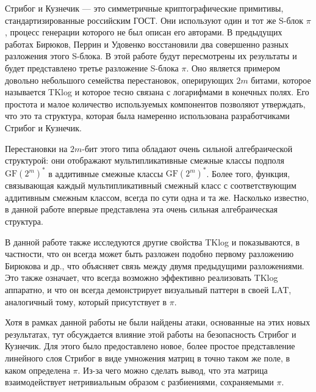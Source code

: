 \abstract

Стрибог и Кузнечик — это симметричные криптографические примитивы, стандартизированные российским ГОСТ. Они используют один и тот же S-блок \(\pi\), процесс генерации которого не был описан его авторами. В предыдущих работах Бирюков, Перрин и Удовенко восстановили два совершенно разных разложения этого S-блока. В этой работе будут пересмотрены их результаты и будет представлено третье разложение S-блока \(\pi\). Оно является примером довольно небольшого семейства перестановок, оперирующих \(2m\) битами, которое называется TKlog и которое тесно связана с логарифмами в конечных полях. Его простота и малое количество используемых компонентов позволяют утверждать, что это та структура, которая была намеренно использована разработчиками Стрибог и Кузнечик.

Перестановки на \(2m\)-бит этого типа обладают очень сильной алгебраической структурой: они отображают мультипликативные смежные классы подполя \(\text{GF}(2^m)^*\) в аддитивные смежные классы \(\text{GF}(2^m)^*\). Более того, функция, связывающая каждый мультипликативный смежный класс с соответствующим аддитивным смежным классом, всегда по сути одна и та же. Насколько известно, в данной работе впервые представлена эта очень сильная алгебраическая структура.

В данной работе также исследуются другие свойства TKlog и показываются, в частности, что он всегда может быть разложен подобно первому разложению Бирюкова и др., что объясняет связь между двумя предыдущими разложениями. Это также означает, что всегда возможно эффективно реализовать TKlog аппаратно, и что он всегда демонстрирует визуальный паттерн в своей LAT, аналогичный тому, который присутствует в \(\pi\).

Хотя в рамках данной работы не были найдены атаки, основанные на этих новых результатах, тут обсуждается влияние этой работы на безопасность Стрибог и Кузнечик. Для этого было предоставлено новое, более простое представление линейного слоя Стрибог в виде умножения матриц в точно таком же поле, в каком определена \(\pi\). Из-за чего можно сделать вывод, что эта матрица взаимодействует нетривиальным образом с разбиениями, сохраняемыми \(\pi\).

